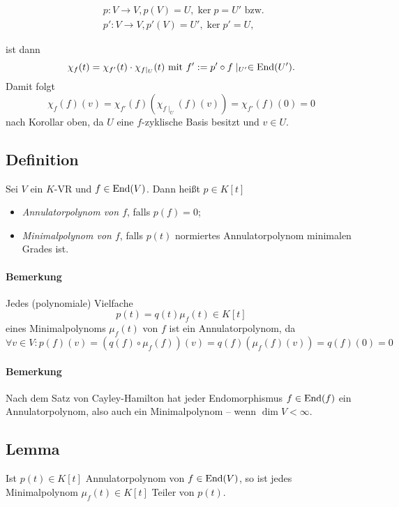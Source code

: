 	\begin{multicols}{2}
 	\begin{figure}[H]\centering
 		
	\end{figure}
	    \begin{align*}
		    &p: V\to V, p(V) = U, \ker p = U' \text{ bzw. } \\
		    &p':V\to V, p'(V) = U', \ker p' = U,
	    \end{align*}
	\end{multicols}
	ist dann
		\[ \chi_f(t) = \chi_{f'}(t)\cdot \chi_{f\mid_U}(t) \text{ mit } f' := p'\circ f\mid_{U'}\in \operatorname{End}(U'). \]
	Damit folgt
		\[ \chi_f(f)(v) = \chi_{f'}(f) \left(\chi_{f\mid_U}(f)(v) \right) = \chi_{f'}(f)(0)=0 \]
	nach Korollar oben, da $ U $ eine $ f $-zyklische Basis besitzt und $ v\in U $.
	
\subsection{Definition}
	Sei $ V $ ein $ K $-VR und $ f\in\operatorname{End}(V) $. Dann heißt $ p\in K[t] $
		\begin{itemize}
			\item \emph{Annulatorpolynom von $ f $}, falls $ p(f)=0 $;
			\item \emph{Minimalpolynom von $ f $}, falls $ p(t) $ normiertes Annulatorpolynom minimalen Grades ist.
		\end{itemize}
\paragraph{Bemerkung}
	Jedes (polynomiale) Vielfache 
		\[ p(t) = q(t)\mu_f(t)\in K[t] \]
	eines Minimalpolynoms $ \mu_f(t) $ von $ f $ ist ein Annulatorpolynom, da
		\[ \forall v\in V: p(f)(v) = \left(q(f)\circ \mu_f(f)\right)(v) = q(f)\left(\mu_f(f)(v)\right) = q(f)(0) = 0 \]
\paragraph{Bemerkung}
	Nach dem Satz von Cayley-Hamilton hat jeder Endomorphismus $ f\in\operatorname{End}(f) $ ein Annulatorpolynom, also auch ein Minimalpolynom -- wenn $ \dim V < \infty $.
	
\subsection{Lemma}
	Ist $ p(t)\in K[t] $ Annulatorpolynom von $ f\in\operatorname{End}(V) $, so ist jedes Minimalpolynom $ \mu_f(t)\in K[t] $ Teiler von $ p(t) $. 
